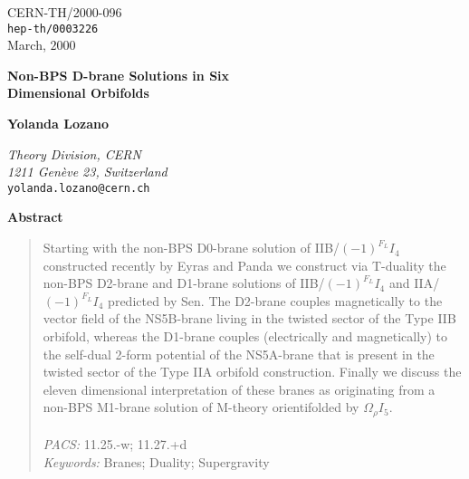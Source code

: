 \documentclass[12pt,a4paper]{article}
\begin{document}
\begin{flushright}
\footnotesize
\footnotesize
CERN-TH/2000-096\\
{\tt hep-th/0003226}\\
March, $2000$
\normalsize
\end{flushright}

\begin{center}



\vspace{.8cm}
{\LARGE {\bf Non-BPS D-brane Solutions in Six}}\\
\vskip 7pt 
{\LARGE {\bf Dimensional Orbifolds}}

\vspace{1cm}


{\bf Yolanda Lozano}

\vspace{.1cm}

{
{\it Theory Division, CERN\\
1211 Gen\`eve 23, Switzerland}\\
{\tt yolanda.lozano@cern.ch}
}

\vspace{.4cm}



\vspace{2cm}


{\bf Abstract}

\end{center}
\begin{quotation}

\small

Starting with the non-BPS D0-brane solution of IIB/$(-1)^{F_L}I_4$
constructed recently by Eyras and Panda we construct via T-duality
the non-BPS D2-brane and D1-brane solutions of IIB/$(-1)^{F_L}I_4$
and IIA/$(-1)^{F_L}I_4$ predicted by Sen. The D2-brane couples
magnetically to the vector field of the NS5B-brane living in the
twisted sector of the Type IIB orbifold, 
whereas the D1-brane couples (electrically
and magnetically) to the self-dual 2-form potential of the NS5A-brane
that is present in the twisted sector of the Type IIA orbifold construction.
Finally we discuss the eleven dimensional interpretation of these branes
as originating from a non-BPS M1-brane solution of M-theory
orientifolded  by $\Omega_\rho I_5$.\\
\\
{\it PACS:} 11.25.-w; 11.27.+d\\
{\it Keywords:} Branes; Duality; Supergravity


\end{quotation}
\end{document}
